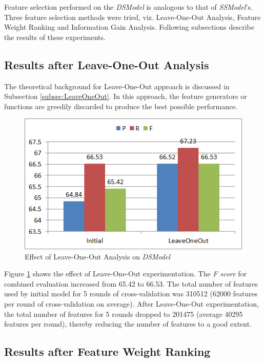 Feature selection performed on the \textit{DSModel} is analogous to that of \textit{SSModel}'s. Three feature selection methods were tried, viz. Leave-One-Out Analysis, Feature Weight Ranking and Information Gain Analysis. Following subsections describe the results of these experiments.

\subsection{Results after Leave-One-Out Analysis}

The theoretical background for Leave-One-Out approach is discussed in Subsection \ref{subsec:LeaveOneOut}. In this approach, the feature generators or functions are greedily discarded to produce the best possible performance.

\begin{figure}
\centering
\includegraphics[scale=0.8]{figures/DSLeaveOneOutComb.png}
\caption{Effect of Leave-One-Out Analysis on \textit{DSModel}}\label{fig:DSLeaveOO}
\end{figure}

Figure \ref{fig:DSLeaveOO} shows the effect of Leave-One-Out experimentation. The \textit{F score} for combined evaluation increased from 65.42 to 66.53. The total number of features used by initial model for 5 rounds of cross-validation was 310512 (62000 features per round of cross-validation on average). After Leave-One-Out experimentation, the total number of features for 5 rounds dropped to 201475 (average 40295 features per round), thereby reducing the number of features to a good extent.

\subsection{Results after Feature Weight Ranking}

